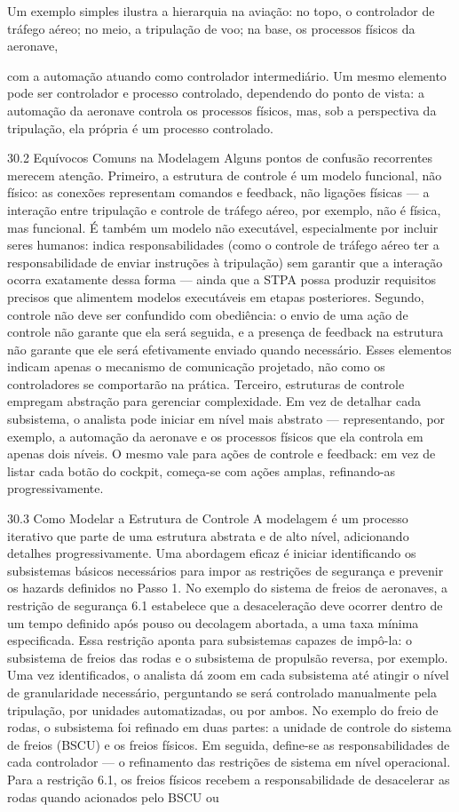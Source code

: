 Um exemplo simples ilustra a hierarquia na aviação: no topo, o controlador de tráfego aéreo; no meio, a tripulação de voo; na base, os processos físicos da aeronave,

com a automação atuando como controlador intermediário. Um mesmo elemento pode ser controlador e processo controlado, dependendo do ponto de vista: a automação da aeronave controla os processos físicos, mas, sob a perspectiva da tripulação, ela própria é um processo controlado.

30.2 Equívocos Comuns na Modelagem Alguns pontos de confusão recorrentes merecem atenção. Primeiro, a estrutura de controle é um modelo funcional, não físico: as conexões representam comandos e feedback, não ligações físicas — a interação entre tripulação e controle de tráfego aéreo, por exemplo, não é física, mas funcional. É também um modelo não executável, especialmente por incluir seres humanos: indica responsabilidades (como o controle de tráfego aéreo ter a responsabilidade de enviar instruções à tripulação) sem garantir que a interação ocorra exatamente dessa forma — ainda que a STPA possa produzir requisitos precisos que alimentem modelos executáveis em etapas posteriores. Segundo, controle não deve ser confundido com obediência: o envio de uma ação de controle não garante que ela será seguida, e a presença de feedback na estrutura não garante que ele será efetivamente enviado quando necessário. Esses elementos indicam apenas o mecanismo de comunicação projetado, não como os controladores se comportarão na prática. Terceiro, estruturas de controle empregam abstração para gerenciar complexidade. Em vez de detalhar cada subsistema, o analista pode iniciar em nível mais abstrato — representando, por exemplo, a automação da aeronave e os processos físicos que ela controla em apenas dois níveis. O mesmo vale para ações de controle e feedback: em vez de listar cada botão do cockpit, começa-se com ações amplas, refinando-as progressivamente.

30.3 Como Modelar a Estrutura de Controle A modelagem é um processo iterativo que parte de uma estrutura abstrata e de alto nível, adicionando detalhes progressivamente. Uma abordagem eficaz é iniciar identificando os subsistemas básicos necessários para impor as restrições de segurança e prevenir os hazards definidos no Passo 1. No exemplo do sistema de freios de aeronaves, a restrição de segurança 6.1 estabelece que a desaceleração deve ocorrer dentro de um tempo definido após pouso ou decolagem abortada, a uma taxa mínima especificada. Essa restrição aponta para subsistemas capazes de impô-la: o subsistema de freios das rodas e o subsistema de propulsão reversa, por exemplo. Uma vez identificados, o analista dá zoom em cada subsistema até atingir o nível de granularidade necessário, perguntando se será controlado manualmente pela tripulação, por unidades automatizadas, ou por ambos. No exemplo do freio de rodas, o subsistema foi refinado em duas partes: a unidade de controle do sistema de freios (BSCU) e os freios físicos. Em seguida, define-se as responsabilidades de cada controlador — o refinamento das restrições de sistema em nível operacional. Para a restrição 6.1, os freios físicos recebem a responsabilidade de desacelerar as rodas quando acionados pelo BSCU ou

